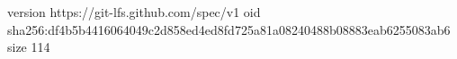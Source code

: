 version https://git-lfs.github.com/spec/v1
oid sha256:df4b5b4416064049c2d858ed4ed8fd725a81a08240488b08883eab6255083ab6
size 114
